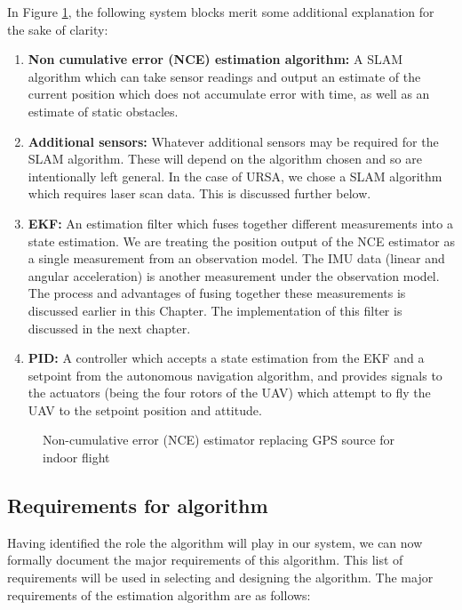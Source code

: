 \documentclass[capstone_report.tex]{subfiles}
\begin{document}
In Figure \ref{fig:estAlg3}, the following system blocks merit some additional explanation for the sake of clarity:
\begin{enumerate}
	\item \textbf{Non cumulative error (NCE) estimation algorithm:} A SLAM algorithm which can take sensor readings and output an estimate of the current position which does not accumulate error with time, as well as an estimate of static obstacles.
	\item \textbf{Additional sensors:} Whatever additional sensors may be required for the SLAM algorithm. These will depend on the algorithm chosen and so are intentionally left general. In the case of URSA, we chose a SLAM algorithm which requires laser scan data. This is discussed further below.
	\item \textbf{EKF:} An estimation filter which fuses together different measurements into a state estimation. We are treating the position output of the NCE estimator as a single measurement from an observation model. The IMU data (linear and angular acceleration) is another measurement under the observation model. The process and advantages of fusing together these measurements is discussed earlier in this Chapter. The implementation of this filter is discussed in the next chapter.
	\item \textbf{PID:} A controller which accepts a state estimation from the EKF and a setpoint from the autonomous navigation algorithm, and provides signals to the actuators (being the four rotors of the UAV) which attempt to fly the UAV to the setpoint position and attitude.
\end{enumerate}

    \begin{figure}[H]
    	\centering
    	
    	\caption{Non-cumulative error (NCE) estimator replacing GPS source for indoor flight\label{fig:estAlg3}}
    \end{figure}

\subsection{Requirements for algorithm}
Having identified the role the algorithm will play in our system, we can now formally document the major requirements of this algorithm. This list of requirements will be used in selecting and designing the algorithm. The major requirements of the estimation algorithm are as follows:
\end{document}
